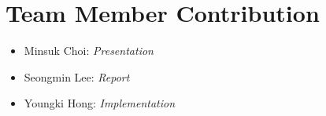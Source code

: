 \section{Team Member Contribution}
\label{sec:contribution}

\begin{itemize}
	\item{Minsuk Choi: \textit{Presentation}}
	\item{Seongmin Lee: \textit{Report}}
	\item{Youngki Hong: \textit{Implementation}}\
\end{itemize}